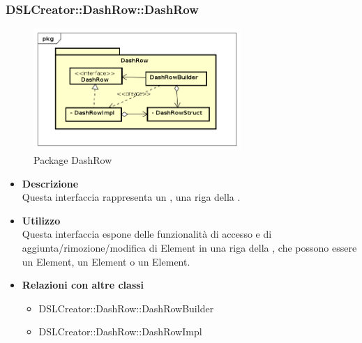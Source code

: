                 \subsubsection{DSLCreator::DashRow::DashRow}
                \begin{figure}[H]
                  \centering
                  \includegraphics[width=0.7\textwidth]{res/img/DashRow.png}
                  \caption{Package DashRow}
                  \label{fig:diagram_model}
                \end{figure}
                    \begin{itemize}
                        \item \textbf{Descrizione} \hfill \\
                            Questa interfaccia rappresenta un , una riga della .
                        \item \textbf{Utilizzo} \hfill \\
                            Questa interfaccia espone delle funzionalità di accesso e di aggiunta/rimozione/modifica di  Element in una riga della , che possono essere un  Element, un  Element o un  Element. 
                        \item \textbf{Relazioni con altre classi}
                            \begin{itemize}
                              \item DSLCreator::DashRow::DashRowBuilder
                              \item DSLCreator::DashRow::DashRowImpl
                            \end{itemize}
                    \end{itemize}

